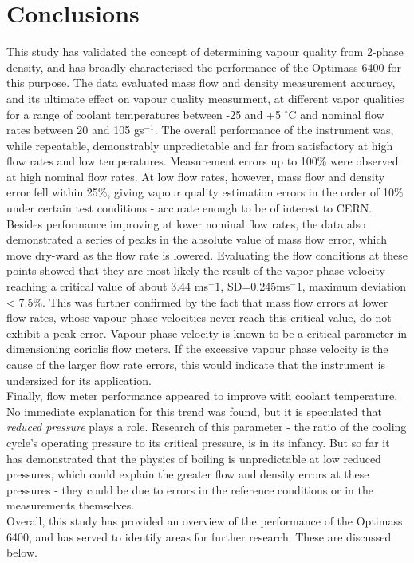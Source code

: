 \documentclass{report}
\begin{document}
\chapter{Conclusions}
This study has validated the concept of determining vapour quality from 2-phase density, and has broadly characterised the performance of the Optimass 6400 for this purpose. The data evaluated mass flow and density measurement accuracy, and its ultimate effect on vapour quality measurment, at different vapor qualities for a range of coolant temperatures between -25 and +5 $^\circ$C and nominal flow rates between 20 and 105 gs$^{-1}$. The overall performance of the instrument was, while repeatable, demonstrably unpredictable and far from satisfactory at high flow rates and low temperatures. Measurement errors up to 100\% were observed at high nominal flow rates. At low flow rates, however, mass flow and density error fell within 25\%, giving vapour quality estimation errors in the order of 10\% under certain test conditions - accurate enough to be of interest to CERN.\\
Besides performance improving at lower nominal flow rates, the data also demonstrated a series of peaks in the absolute value of mass flow error, which move dry-ward as the flow rate is lowered. Evaluating the flow conditions at these points showed that they are most likely the result of the vapor phase velocity reaching a critical value of about 3.44 ms$^-1$, SD=0.245ms$^-1$, maximum deviation < 7.5\%. This was further confirmed by the fact that mass flow errors at lower flow rates, whose vapour phase velocities never reach this critical value, do not exhibit a peak error. Vapour phase velocity is known to be a critical parameter in dimensioning coriolis flow meters. If the excessive vapour phase velocity is the cause of the larger flow rate errors, this would indicate that the instrument is undersized for its application.\\
Finally, flow meter performance appeared to improve with coolant temperature. No immediate explanation for this trend was found, but it is speculated that \textit{reduced pressure} plays a role. Research of this parameter - the ratio of the cooling cycle's operating pressure to its critical pressure, is in its infancy. But so far it has demonstrated that the physics of boiling is unpredictable at low reduced pressures, which could explain the greater flow and density errors at these pressures - they could be due to errors in the reference conditions or in the measurements themselves.\\
Overall, this study has provided an overview of the performance of the Optimass 6400, and has served to identify areas for further research. These are discussed below.
\end{document}
